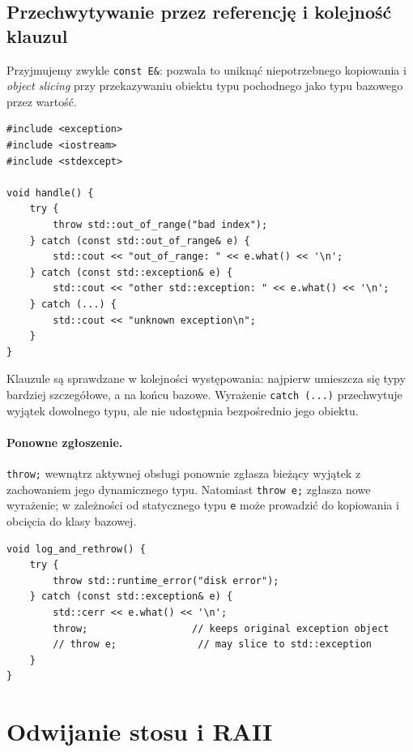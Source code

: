 \subsection{Przechwytywanie przez referencję i kolejność klauzul}

Przyjmujemy zwykle \texttt{const E\&}: pozwala to uniknąć niepotrzebnego
kopiowania i \emph{object slicing} przy przekazywaniu obiektu typu
pochodnego jako typu bazowego przez wartość.

\begin{lstlisting}
#include <exception>
#include <iostream>
#include <stdexcept>

void handle() {
    try {
        throw std::out_of_range("bad index");
    } catch (const std::out_of_range& e) {
        std::cout << "out_of_range: " << e.what() << '\n';
    } catch (const std::exception& e) {
        std::cout << "other std::exception: " << e.what() << '\n';
    } catch (...) {
        std::cout << "unknown exception\n";
    }
}
\end{lstlisting}

Klauzule są sprawdzane w kolejności występowania: najpierw umieszcza
się typy bardziej szczegółowe, a na końcu bazowe. Wyrażenie
\texttt{catch (...)} przechwytuje wyjątek dowolnego typu, ale nie
udostępnia bezpośrednio jego obiektu.

\paragraph{Ponowne zgłoszenie.}
\texttt{throw;} wewnątrz aktywnej obsługi ponownie zgłasza bieżący
wyjątek z zachowaniem jego dynamicznego typu. Natomiast
\texttt{throw e;} zgłasza nowe wyrażenie; w zależności od statycznego
typu \texttt{e} może prowadzić do kopiowania i obcięcia do klasy
bazowej.

\begin{lstlisting}
void log_and_rethrow() {
    try {
        throw std::runtime_error("disk error");
    } catch (const std::exception& e) {
        std::cerr << e.what() << '\n';
        throw;                  // keeps original exception object
        // throw e;              // may slice to std::exception
    }
}
\end{lstlisting}

\section{Odwijanie stosu i RAII}
\label{sec:cpp11-unwinding}

